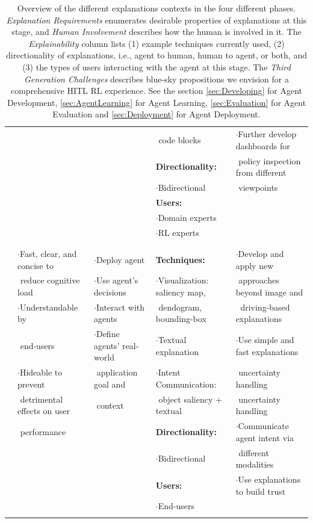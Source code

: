 \documentclass[twoside,11pt]{article}
\begin{document}
\begin{enumerate}
\begin{table}[!htbp]
{\begin{tabular}{|c||l|l|l|l|}
			&&& $ $ code blocks& $\cdot$Further develop dashboards for \\
			&   & 	&	 \textbf{Directionality:}	& $ $ policy inspection from different 	\\
			&   & 	&	 $\cdot$Bidirectional	& $ $ viewpoints	\\
			&    & 	&	 \textbf{Users:}	& 	\\
			&   & 	&	 $\cdot$Domain experts	&	\\
			&  $ $   & 	&	 $\cdot$RL experts	& 	\\
			&  &  & & \\
			\cline{1-5}
			\multirow{12}{*}{\rotatebox{90}{\hspace{0em}\textsc{Deployment}}}
			&  &  & & \\
			&  $\cdot$Fast, clear, and concise to& $\cdot$Deploy agent	&\textbf{Techniques:}	&	$\cdot$Develop and apply new \\
			&  $ $  reduce cognitive load& $\cdot$Use agent’s decisions	&	 $\cdot$Visualization: saliency map,	&$ $ approaches beyond image and 	\\
			&  $\cdot$Understandable by & $\cdot$Interact with agents	&	 $ $ dendogram, bounding-box	&	$\ $ driving-based explanations\\
			& $ $ end-users	 & $\cdot$Define agents' real-world 	& $\cdot$Textual explanation	 & $\cdot$Use simple and fast explanations	\\
			& $\cdot$Hideable to prevent  & $ $ application goal and	&	 $\cdot$Intent Communication:	& $ $ uncertainty handling\\
			& $ $ detrimental effects on user & $ $ context& $ $ object saliency + textual& $ $ uncertainty handling\\
			& $ $ performance & 	&	\textbf{Directionality:}	&$\cdot$Communicate agent intent via 	\\
			&   & 	&	 $\cdot$Bidirectional	& $ $ different modalities	\\
			&   & 	&\textbf{Users:}	& $\cdot$Use explanations to build trust	\\
			&   & 	&	 $\cdot$End-users	&	\\
			&  &  & & \\
			\cline{1-5}
		\end{tabular}
	}
	\caption{Overview of the different explanations contexts in the four different phases. \emph{Explanation Requirements} enumerates desirable properties of explanations at this stage, and \emph{Human Involvement} describes how the human is involved in it. The \emph{Explainability} column lists (1) example techniques currently used, (2) directionality of explanations, i.e., agent to human, human to agent, or both, and (3) the types of users interacting with the agent at this stage. The \emph{Third Generation Challenges} describes blue-sky propositions we envision for a comprehensive HITL RL experience. See the section \ref{sec:Developing} for Agent Development, \ref{sec:AgentLearning} for Agent Learning, \ref{sec:Evaluation} for Agent Evaluation and \ref{sec:Deployment} for Agent Deployment.}
	\label{table:Explanations_table}
\end{table}


\end{enumerate}
\end{document}

